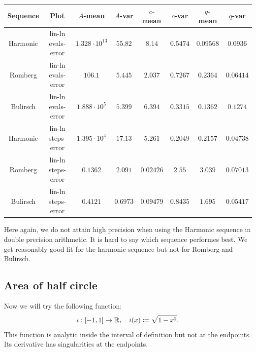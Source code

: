 \begin{table}[H]
    \centering
    \small
    \begin{tabular}{c|c||c|c|c|c|c	|c}
Sequence & Plot & \(A\)-mean & \(A\)-var & \(c\)-mean & \(c\)-var & \(q\)-mean & \(q\)-var\\\hline
\rowcolor{yellow}
Harmonic & lin-ln evals-error & \(1.328\cdot 10^{13}\) & \(55.82\) & \(8.14\) & \(0.5474\) & \(0.09568\) & \(0.0936\) \\
\rowcolor{red}
Romberg & lin-ln evals-error & \(106.1\) & \(5.445\) & \(2.037\) & \(0.7267\) & \(0.2364\) & \(0.06414\) \\
\rowcolor{red}
Bulirsch & lin-ln evals-error & \(1.888\cdot 10^{5}\) & \(5.399\) & \(6.394\) & \(0.3315\) & \(0.1362\) & \(0.1274\) \\
\rowcolor{yellow}
Harmonic & lin-ln steps-error & \(1.395\cdot 10^{4}\) & \(17.13\) & \(5.261\) & \(0.2049\) & \(0.2157\) & \(0.04738\) \\
\rowcolor{red}
Romberg & lin-ln steps-error & \(0.1362\) & \(2.091\) & \(0.02426\) & \(2.55\) & \(3.039\) & \(0.07013\) \\
\rowcolor{red}
Bulirsch & lin-ln steps-error & \(0.4121\) & \(0.6973\) & \(0.09479\) & \(0.8435\) & \(1.695\) & \(0.05417\) \\
    \end{tabular}
    \label{tab:my_label}
\end{table}

Here again, we do not attain high precision when using the Harmonic sequence in double precision arithmetic. It is hard to say which sequence performes best. We get reasonably good fit for the harmonic sequence but not for Romberg and Bulirsch.

\subsection{Area of half circle}

Now we will try the following function:
\[
i: [-1, 1] \rightarrow \mathbb{R}, \quad i(x)\coloneqq \sqrt{1-x^2}.
\]
This function is analytic inside the interval of definition but not at the endpoints. Its derivative has singularities at the endpoints.

